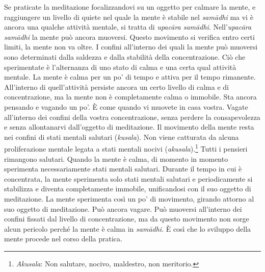 Se praticate la meditazione focalizzandovi su un oggetto per calmare la
mente, e raggiungere un livello di quiete nel quale la mente è stabile
nel \emph{samādhi} ma vi è ancora una qualche attività mentale, si
tratta di \emph{upacāra samādhi}. Nell'\emph{upacāra samādhi} la mente
può ancora muoversi. Questo movimento si verifica entro certi limiti, la
mente non va oltre. I confini all'interno dei quali la mente può
muoversi sono determinati dalla saldezza e dalla stabilità della
concentrazione. Ciò che sperimentate è l'alternanza di uno stato di
calma e una certa qual attività mentale. La mente è calma per un po' di
tempo e attiva per il tempo rimanente. All'interno di quell'attività
persiste ancora un certo livello di calma e di concentrazione, ma la
mente non è completamente calma o immobile. Sta ancora pensando e
vagando un po'. È come quando vi muovete in casa vostra. Vagate
all'interno dei confini della vostra concentrazione, senza perdere la
consapevolezza e senza allontanarvi dall'oggetto di meditazione. Il
movimento della mente resta nei confini di stati mentali salutari
(\emph{kusala}). Non viene catturata da alcuna proliferazione mentale
legata a stati mentali nocivi (\emph{akusala}).\footnote{\emph{Akusala}:
  Non salutare, nocivo, maldestro, non meritorio.} Tutti i pensieri
rimangono salutari. Quando la mente è calma, di momento in momento
sperimenta necessariamente stati mentali salutari. Durante il tempo in
cui è concentrata, la mente sperimenta solo stati mentali salutari e
periodicamente si stabilizza e diventa completamente immobile,
unificandosi con il suo oggetto di meditazione. La mente sperimenta così
un po' di movimento, girando attorno al suo oggetto di meditazione. Può
ancora vagare. Può muoversi all'interno dei confini fissati dal livello
di concentrazione, ma da questo movimento non sorge alcun pericolo
perché la mente è calma in \emph{samādhi}. È così che lo sviluppo della
mente procede nel corso della pratica.

